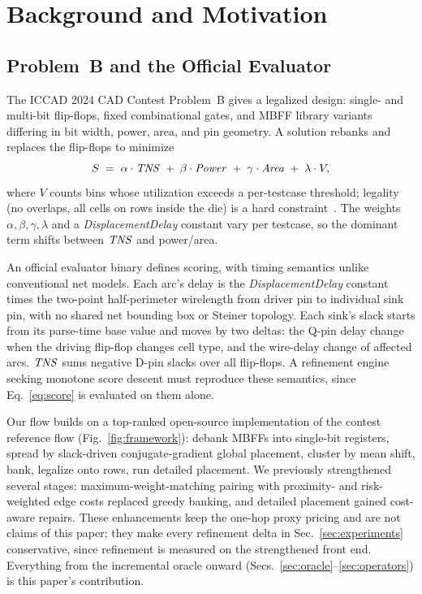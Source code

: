 \section{Background and Motivation}
\label{sec:background}



\subsection{Problem~B and the Official Evaluator}
\label{sec:problemb}

The ICCAD 2024 CAD Contest Problem~B gives a legalized design: single- and multi-bit flip-flops, fixed combinational gates, and MBFF library variants differing in bit width, power, area, and pin geometry. A solution rebanks and replaces the flip-flops to minimize
\begin{equation}
S \;=\; \alpha \cdot \mathit{TNS} \;+\; \beta \cdot \mathit{Power} \;+\; \gamma \cdot \mathit{Area} \;+\; \lambda \cdot V,
\label{eq:score}
\end{equation}
where $V$ counts bins whose utilization exceeds a per-testcase threshold; legality (no overlaps, all cells on rows inside the die) is a hard constraint~\cite{yang2024contest,fang2024overview}. The weights $\alpha,\beta,\gamma,\lambda$ and a \emph{DisplacementDelay} constant vary per testcase, so the dominant term shifts between $\mathit{TNS}$ and power/area.

An official evaluator binary defines scoring, with timing semantics unlike conventional net models. Each arc's delay is the \emph{Displacement\-Delay} constant times the two-point half-perimeter wirelength from driver pin to individual sink pin, with no shared net bounding box or Steiner topology. Each sink's slack starts from its parse-time base value and moves by two deltas: the Q-pin delay change when the driving flip-flop changes cell type, and the wire-delay change of affected arcs. $\mathit{TNS}$ sums negative D-pin slacks over all flip-flops. A refinement engine seeking monotone score descent must reproduce these semantics, since Eq.~\eqref{eq:score} is evaluated on them alone.

Our flow builds on a top-ranked open-source implementation of the contest reference flow (Fig.~\ref{fig:framework}): debank MBFFs into single-bit registers, spread by slack-driven conjugate-gradient global placement, cluster by mean shift, bank, legalize onto rows, run detailed placement. We previously strengthened several stages: maximum-weight-matching pairing with proximity- and risk-weighted edge costs replaced greedy banking, and detailed placement gained cost-aware repairs. These enhancements keep the one-hop proxy pricing and are not claims of this paper; they make every refinement delta in Sec.~\ref{sec:experiments} conservative, since refinement is measured on the strengthened front end. Everything from the incremental oracle onward (Secs.~\ref{sec:oracle}--\ref{sec:operators}) is this paper's contribution.

